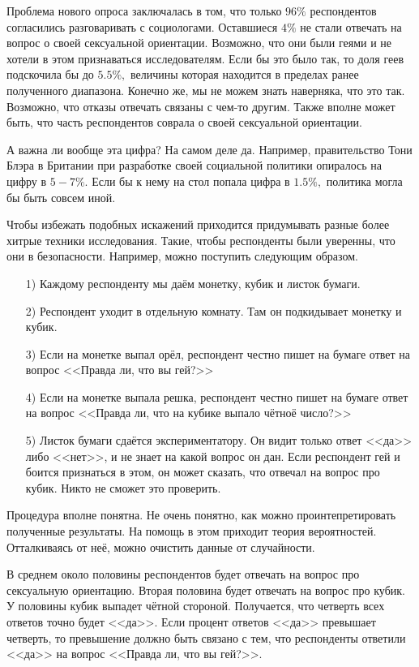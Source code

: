 \documentclass[12pt, a4paper, oneside]{article}
\begin{document}
Проблема нового опроса заключалась в том, что только $96\%$ респондентов согласились разговаривать с социологами. Оставшиеся $4\%$ не стали отвечать на вопрос о своей сексуальной ориентации. Возможно, что они были геями и не хотели в этом признаваться исследователям. Если бы это было так, то доля геев подскочила бы до $5.5\%,$ величины которая находится в пределах ранее полученного диапазона. Конечно же, мы не можем знать наверняка, что это так. Возможно, что отказы отвечать связаны с чем-то другим. Также вполне может быть, что часть респондентов соврала о своей сексуальной ориентации. 

А важна ли вообще эта цифра? На самом деле да. Например, правительство Тони Блэра в Британии при разработке своей социальной политики опиралось на цифру в $5-7\%.$ Если бы к нему на стол попала цифра в $1.5\%,$ политика могла бы быть совсем иной. 

Чтобы избежать подобных искажений приходится придумывать разные более хитрые техники исследования. Такие, чтобы респонденты были уверенны, что они в безопасности. Например, можно поступить следующим образом.

\begin{enumerate} 
    \item[1)] Каждому респонденту мы даём монетку, кубик и листок бумаги. 
    \item[2)] Респондент уходит в отдельную комнату. Там он подкидывает монетку и кубик. 
    \item[3)] Если на монетке выпал орёл, респондент честно пишет на бумаге ответ на вопрос <<Правда ли, что вы гей?>>
    \item[4)] Если на монетке выпала решка, респондент честно пишет на бумаге ответ на вопрос <<Правда ли, что на кубике выпало чётноё число?>>
    \item[5)] Листок бумаги сдаётся экспериментатору. Он видит только ответ <<да>> либо <<нет>>, и не знает на какой вопрос он дан. Если респондент гей и боится признаться в этом, он может сказать, что отвечал на вопрос про кубик. Никто не сможет это проверить. 
\end{enumerate} 

Процедура вполне понятна. Не очень понятно, как можно проинтепретировать полученные результаты. На помощь в этом приходит теория вероятностей. Отталкиваясь от неё, можно очистить данные от случайности.

В среднем около половины респондентов будет отвечать на вопрос про сексуальную ориентацию. Вторая половина будет отвечать на вопрос про кубик. У половины кубик выпадет чётной стороной. Получается, что четверть всех ответов точно будет <<да>>. Если процент ответов <<да>> превышает четверть, то превышение должно быть связано с тем, что респонденты ответили <<да>> на вопрос <<Правда ли, что вы гей?>>.
\end{document}
